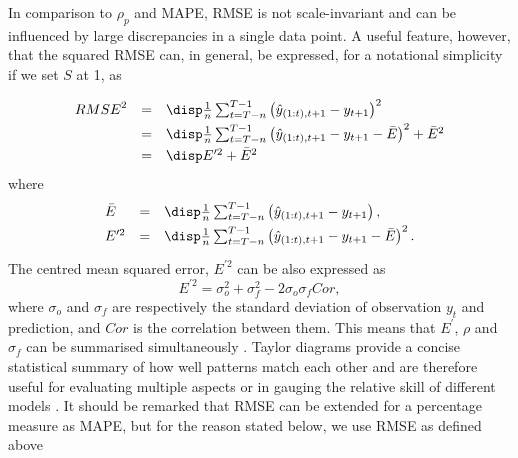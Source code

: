 In comparison to $\rho_p$ and MAPE, RMSE is not scale-invariant and can be influenced by large discrepancies in a single data point. A useful feature, however, that the squared RMSE can, in general, be expressed,  for a notational simplicity if we set $S$ at 1, as

\begin{equation}
\label{eqn:rmse2}
\begin{array}{lcl}
\vspace{0.1cm}
{RMSE}^2 &=& \disp \frac{1}{n} \sum_{t=T-n}^{T-1} \left( \hat{y}_{(1:t),t+1}-y_{t+1} \right)^2 \\
\vspace{0.1cm}
&=& \disp \frac{1}{n} \sum_{t=T-n}^{T-1} \left( \hat{y}_{(1:t),t+1}-y_{t+1} - \bar{E} \right)^2 + \bar{E}^2 \\
&=& \disp E^{\prime 2} + \bar{E}^2
\end{array}
\end{equation}
where 
\begin{equation}
\begin{array}{lcl}
\vspace{0.1cm}
\bar{E} &=& \disp \frac{1}{n} \sum_{t=T-n}^{T-1} \left( \hat{y}_{(1:t),t+1}-y_{t+1} \right), \\
\vspace{0.1cm}
E^{\prime 2} &=& \disp \frac{1}{n} \sum_{t=T-n}^{T-1} \left( \hat{y}_{(1:t),t+1}-y_{t+1} - \bar{E} \right)^2.
\end{array}
\end{equation}
The centred mean squared error, $E^{\prime 2}$ can be also expressed as 
\begin{equation}
E^{\prime 2} = \sigma_o^2 + \sigma_f^2 - 2\sigma_o \sigma_f Cor,
\end{equation}
where $\sigma_o$ and $\sigma_f$ are respectively the standard deviation of observation $y_t$ and prediction, and $Cor$ is the correlation between them. This means that $E^\prime$, $\rho$ and $\sigma_f$ can be summarised simultaneously \parencite{taylor2001summarizing}. Taylor diagrams provide a concise statistical summary of how well patterns match each other and are therefore useful for evaluating multiple aspects or in gauging the relative skill of different models \parencite{griggs2002climate}. It should be remarked that RMSE can be extended for a percentage measure as MAPE, but for the reason stated below, we use RMSE as defined above 

